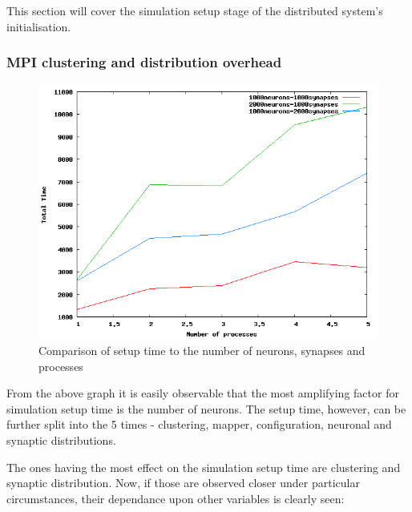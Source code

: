 This section will cover the simulation setup stage of the distributed system's initialisation.

\subsubsection{MPI clustering and distribution overhead}

\begin{figure}[h]
\begin{center}
\includegraphics[scale = 0.5]{images/setup_comparison.png}
\end{center}
\caption{Comparison of setup time to the number of neurons, synapses and processes}
\end{figure}

From the above graph it is easily observable that the most amplifying factor for simulation setup time is the number of neurons. The setup time, however, can be further split into the 5 times - clustering, mapper, configuration, neuronal and synaptic distributions.

The ones having the most effect on the simulation setup time are clustering and synaptic distribution. Now, if those are observed closer under particular circumstances, their dependance upon other variables is clearly seen:

